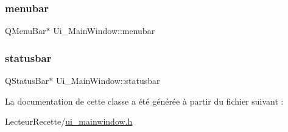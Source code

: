 \subsubsection{\texorpdfstring{menubar}{menubar}}
{\footnotesize\ttfamily Q\+Menu\+Bar$\ast$ Ui\+\_\+\+Main\+Window\+::menubar}

\mbox{\label{class_ui___main_window_a1687cceb1e2787aa1f83e50433943a91}} 
\subsubsection{\texorpdfstring{statusbar}{statusbar}}
{\footnotesize\ttfamily Q\+Status\+Bar$\ast$ Ui\+\_\+\+Main\+Window\+::statusbar}



La documentation de cette classe a été générée à partir du fichier suivant \+:\begin{DoxyCompactItemize}
\item 
Lecteur\+Recette/\hyperlink{ui__mainwindow_8h}{ui\+\_\+mainwindow.\+h}\end{DoxyCompactItemize}
